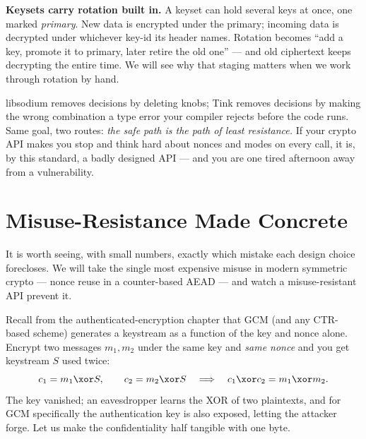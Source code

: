 \textbf{Keysets carry rotation built in.} A keyset can hold several keys at once,
one marked \emph{primary}. New data is encrypted under the primary; incoming data
is decrypted under whichever key-id its header names. Rotation becomes ``add a key,
promote it to primary, later retire the old one'' --- and old ciphertext keeps
decrypting the entire time. We will see why that staging matters when we work
through rotation by hand.

\begin{intuitionbox}
libsodium removes decisions by deleting knobs; Tink removes decisions by making the
wrong combination a type error your compiler rejects before the code runs. Same
goal, two routes: \emph{the safe path is the path of least resistance.} If your
crypto API makes you stop and think hard about nonces and modes on every call, it
is, by this standard, a badly designed API --- and you are one tired afternoon away
from a vulnerability.
\end{intuitionbox}

\section{Misuse-Resistance Made Concrete}
\label{ch39:misuse}

It is worth seeing, with small numbers, exactly which mistake each design choice
forecloses. We will take the single most expensive misuse in modern symmetric
crypto --- nonce reuse in a counter-based AEAD --- and watch a misuse-resistant API
prevent it.

Recall from the authenticated-encryption chapter that GCM (and any CTR-based
scheme) generates a keystream as a function of the key and nonce alone. Encrypt two
messages $m_1, m_2$ under the same key and \emph{same nonce} and you get keystream
$S$ used twice:
\[
c_1 = m_1 \xor S, \qquad c_2 = m_2 \xor S
\quad\Longrightarrow\quad
c_1 \xor c_2 = m_1 \xor m_2 .
\]
The key vanished; an eavesdropper learns the XOR of two plaintexts, and for GCM
specifically the authentication key is also exposed, letting the attacker forge.
Let us make the confidentiality half tangible with one byte.

